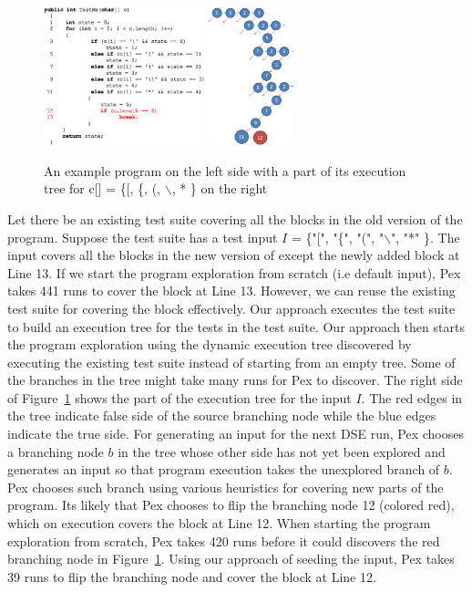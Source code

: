 \begin{figure}
\includegraphics[height=4cm, keepaspectratio]{Figures/ex2}
\includegraphics[height=4cm, keepaspectratio]{Figures/exTree}
\scriptsize\caption{An example program on the left side with a part of its execution tree for c[] = \{[, \{, (, $\backslash$, * \} on the right}
\label{fig:example2}
\end{figure}
Let there be an existing test suite covering all the blocks in the old version of the program. Suppose the test suite has a test input $I$ = \{"[", "\{", "(", "$\backslash$", "*" \}. The input covers all the blocks in the new version of  except the newly added block at Line 13. If we start the program exploration from scratch (i.e default input), Pex takes 441 runs to cover the block at Line 13. However, we can reuse the existing test suite for covering the block effectively. Our approach executes the test suite to build an execution tree for the tests in the test suite. Our approach then starts the program exploration using the dynamic execution tree discovered by executing the existing test suite instead of starting from an empty tree. Some of the branches in the tree might take many runs for Pex to discover. The right side of Figure~\ref{fig:example2} shows the part of the execution tree for the input $I$. The red edges in the tree indicate false side of the source branching node while the blue edges indicate the true side. For generating an input for the next DSE run, Pex chooses a branching node $b$ in the tree whose other side has not yet been explored and generates an input so that program execution takes the unexplored branch of $b$. Pex chooses such branch using various heuristics for covering new parts of the program. Its likely that Pex chooses to flip the branching node 12 (colored red), which on execution covers the block at Line 12. When starting the program exploration from scratch, Pex takes 420 runs before it could discovers the red branching node in Figure~\ref{fig:example2}. Using our approach of seeding the input, Pex takes 39 runs to flip the branching node and cover the block at Line 12. 